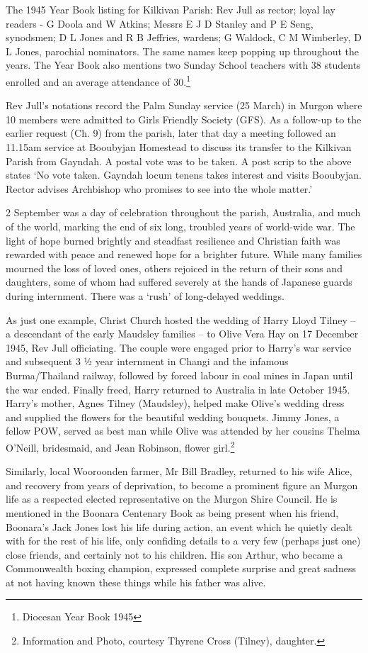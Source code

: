 The 1945 Year Book listing for Kilkivan Parish: Rev Jull as rector; loyal lay readers - G Doola and W Atkins; Messrs E J D Stanley and P E Seng, synodsmen; D L Jones and R B Jeffries, wardens; G Waldock, C M Wimberley, D L Jones, parochial nominators. The same names keep popping up throughout the years. The Year Book also mentions two Sunday School teachers with 38 students enrolled and an average attendance of 30.\footnote{Diocesan Year Book 1945}

Rev Jull's notations record the Palm Sunday service (25 March) in Murgon where 10 members were admitted to Girls Friendly Society (GFS). As a follow-up to the earlier request (Ch. 9) from the parish, later that day a meeting followed an 11.15am service at Booubyjan Homestead to discuss its transfer to the Kilkivan Parish from Gayndah. A postal vote was to be taken. A post scrip to the above states `No vote taken. Gayndah locum tenens takes interest and visits Booubyjan. Rector advises Archbishop who promises to see into the whole matter.'

2 September was a day of celebration throughout the parish, Australia, and much of the world, marking the end of six long, troubled years of world-wide war. The light of hope burned brightly and steadfast resilience and Christian faith was rewarded with peace and renewed hope for a brighter future. While many families mourned the loss of loved ones, others rejoiced in the return of their sons and daughters, some of whom had suffered severely at the hands of Japanese guards during internment. There was a `rush' of long-delayed weddings.

As just one example, Christ Church hosted the wedding of Harry Lloyd Tilney -- a descendant of the early Maudsley families -- to Olive Vera Hay on 17 December 1945, Rev Jull officiating. The couple were engaged prior to Harry's war service and subsequent 3 ½ year internment in Changi and the infamous Burma/Thailand railway, followed by forced labour in coal mines in Japan until the war ended. Finally freed, Harry returned to Australia in late October 1945. Harry's mother, Agnes Tilney (Maudsley), helped make Olive's wedding dress and supplied the flowers for the beautiful wedding bouquets. Jimmy Jones, a fellow POW, served as best man while Olive was attended by her cousins Thelma O'Neill, bridesmaid, and Jean Robinson, flower girl.\footnote{Information and Photo, courtesy Thyrene Cross (Tilney), daughter.}

Similarly, local Wooroonden farmer, Mr Bill Bradley, returned to his wife Alice, and recovery from years of deprivation, to become a prominent figure an Murgon life as a respected elected representative on the Murgon Shire Council. He is mentioned in the Boonara Centenary Book as being present when his friend, Boonara's Jack Jones lost his life during action, an event which he quietly dealt with for the rest of his life, only confiding details to a very few (perhaps just one) close friends, and certainly not to his children. His son Arthur, who became a Commonwealth boxing champion, expressed complete surprise and great sadness at not having known these things while his father was alive.

